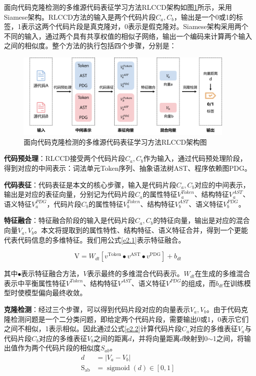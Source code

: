 面向代码克隆检测的多维源代码表征学习方法RLCCD架构如图\ref{fig:flow}所示，采用Siamese架构。RLCCD方法的输入是两个代码片段$C_{a},C_{b}$，输出是一个0或1的标签，1表示这两个代码片段是真克隆对，0表示是假克隆对。Siamese架构采用两个不同的输入，通过两个具有共享权值的相似子网络，输出一个编码来计算两个输入之间的相似度。整个方法的执行包括四个步骤，分别是：
\begin{figure}[H]
    \centering
    \includegraphics[width=0.95\textwidth]{figures/flow}
    \caption{面向代码克隆检测的多维源代码表征学习方法RLCCD架构图}
    \label{fig:flow}
\end{figure}

\textbf{代码预处理}：RLCCD接受两个代码片段$C_{a},C_{b}$作为输入，通过代码预处理阶段，得到对应的中间表示：词法单元Token序列、抽象语法树AST、程序依赖图PDG。

\textbf{代码表征}：代码表征是本文的核心步骤，输入是代码片段$C_{a},C_{b}$对应的中间表示，输出是对应的表征向量，分别记为代码片段$C_{a}$的属性特征$V_{a}^{Token}$、结构特征$V_{a}^{AST}$、语义特征$V_{a}^{PDG}$，代码片段$C_{b}$的属性特征$V_{b}^{Token}$、结构特征$V_{b}^{AST}$、语义特征$V_{b}^{PDG}$。

\textbf{特征融合}：特征融合阶段的输入是代码片段$C_{a},C_{b}$的特征向量，输出是对应的混合向量$V_{a},V_{b}$。本文将提取到的属性特性、结构特征、语义特征合并，得到一个更能代表代码信息的多维特征。我们用公式\ref{e2.1}表示特征融合。

\begin{equation}\label{e2.1}
    \mathrm{V}=W_{dt}\left[v^{\text{Token}} \bullet v^{\text{AST}} \bullet v^{\text{PDG}}\right]+b_{dt}
\end{equation}

其中$\bullet$表示特征融合方法，$V$表示最终的多维混合代码表示。$W_{dt}$在生成的多维混合表示中平衡属性特征$V^{Token}$、结构特征$V^{AST}$、语义特征$V^{PDG}$的组成，而$b_{dt}$在训练模型时使模型偏向最终收敛。

\textbf{克隆检测}：经过三个步骤，可以得到代码片段对应的向量表示$V_{a},V_{b}$。由于代码克隆检测问题是一个二分类问题，即给定两个代码片段，需要输出0或1，0表示它们之间不相似，1表示相似。因此通过公式\ref{e2.2}计算代码片段$C_{a}$对应的多维表征$V_{a}$与代码片段$C_{b}$对应的多维表征$V_{b}$之间的距离$d$，并将向量距离$d$映射到0$\sim$1之间，将输出值作为两个代码片段的相似度$S_{ab}$。
\begin{equation}\label{e2.2}
    \begin{split}
    d &= \left|V_{a}-V_{b}\right| \\
    \mathrm{S_{ab}} &=\operatorname{sigmoid}\left(d\right) \in[0,1]
    \end{split}
\end{equation}

